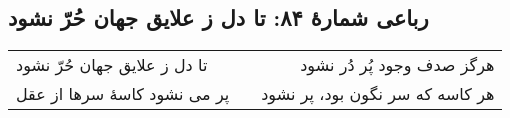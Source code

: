 \begin{center}
\section*{رباعی شمارهٔ ۸۴: تا دل ز علایق جهان حُرّ نشود}
\label{sec:084}
\begin{longtable}{l p{0.5cm} r}
تا دل ز علایق جهان حُرّ نشود
&&
هرگز صدف وجود پُر دُر نشود
\\
پر می نشود کاسهٔ سرها از عقل
&&
هر کاسه که سر نگون بود، پر نشود
\\
\end{longtable}
\end{center}
